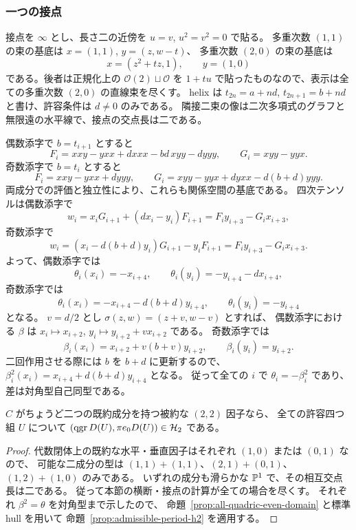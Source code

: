 \subsubsection{一つの接点}

接点を $\infty$ とし、長さ二の近傍を $u=v$, $u^2=v^2=0$ で貼る。
多重次数 $(1,1)$ の束の基底は $x=(1,1)$, $y=(z,w-t)$、
多重次数 $(2,0)$ の束の基底は
\[
 x=(z^2+t z,1),\qquad y=(1,0)
\]
である。後者は正規化上の $\mathcal O(2)\sqcup\mathcal O$ を
$1+t u$ で貼ったものなので、表示は全ての多重次数 $(2,0)$ の直線束を尽くす。
helix は
$t_{2n}=a+nd$, $t_{2n+1}=b+nd$ と書け、許容条件は $d\ne0$ のみである。
隣接二束の像は二次多項式のグラフと無限遠の水平線で、接点の交点長は二である。

偶数添字で $b=t_{i+1}$ とすると
\[
 F_i=xxy-yxx+dxxx-bd\,xyy-dyyy,
 \qquad G_i=xyy-yyx.
\]
奇数添字で $b=t_i$ とすると
\[
 F_i=xxy-yxx+dyyy,
 \qquad G_i=xyy-yyx+dyxx-d(b+d)yyy.
\]
両成分での評価と独立性により、これらも関係空間の基底である。
四次テンソルは偶数添字で
\[
 w_i=x_iG_{i+1}+(dx_i-y_i)F_{i+1}
     =F_i y_{i+3}-G_i x_{i+3},
\]
奇数添字で
\[
 w_i=(x_i-d(b+d)y_i)G_{i+1}-y_iF_{i+1}
     =F_i y_{i+3}-G_i x_{i+3}.
\]
よって、偶数添字では
\[
 \theta_i(x_i)=-x_{i+4},\qquad
 \theta_i(y_i)=-y_{i+4}-dx_{i+4},
\]
奇数添字では
\[
 \theta_i(x_i)=-x_{i+4}-d(b+d)y_{i+4},\qquad
 \theta_i(y_i)=-y_{i+4}
\]
となる。
$v=d/2$ とし $\sigma(z,w)=(z+v,w-v)$ とすれば、
偶数添字における $\beta$ は $x_i\mapsto x_{i+2}$,
$y_i\mapsto y_{i+2}+v x_{i+2}$ である。
奇数添字では
\[
 \beta_i(x_i)=x_{i+2}+v(b+v)y_{i+2},\qquad
 \beta_i(y_i)=y_{i+2}.
\]
二回作用させる際には $b$ を $b+d$ に更新するので、
$\beta_i^2(x_i)=x_{i+4}+d(b+d)y_{i+4}$ となる。
従って全ての $i$ で $\theta_i=-\beta_i^2$ であり、差は対角型自己同型である。

\begin{theorem}
\label{thm:all-reduced-two-component-inverse}
$C$ がちょうど二つの既約成分を持つ被約な $(2,2)$ 因子なら、
全ての許容四つ組 $U$ について
$(\operatorname{qgr} D(U),\pi e_0D(U))\in\mathcal H_2$ である。
\end{theorem}

\begin{proof}
代数閉体上の既約な水平・垂直因子はそれぞれ $(1,0)$ または $(0,1)$ なので、
可能な二成分の型は
$(1,1)+(1,1)$、$(2,1)+(0,1)$、$(1,2)+(1,0)$ のみである。
いずれの成分も滑らかな $\mathbb P^1$ で、その相互交点長は二である。
従って本節の横断・接点の計算が全ての場合を尽くす。
それぞれ $\beta^2=\theta$ を対角型まで示したので、
命題~\ref{prop:all-quadric-even-domain} と標準 hull を用いて
命題~\ref{prop:admissible-period-h2} を適用する。
\end{proof}

